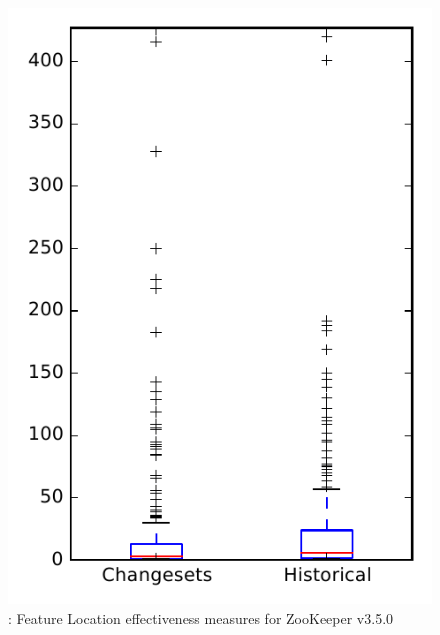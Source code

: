 
\begin{figure}
\centering
\includegraphics[height=0.4\textheight]{figures/flt/rq2_zookeeper}
\caption{\ftwo: Feature Location effectiveness measures for ZooKeeper v3.5.0}
\label{fig:flt:rq2:zookeeper}
\end{figure}
